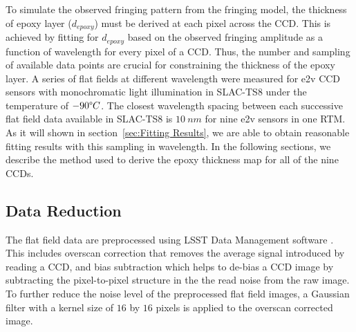 \documentclass[twocolumn]{aastex63} %
\begin{document}
\begin{CJK*}{UTF8}{gbsn}
To simulate the observed fringing pattern from the fringing model, the thickness of epoxy layer ($d_{epoxy}$) must be derived at each pixel across the CCD. This is achieved by fitting for $d_{epoxy}$ based on the observed fringing amplitude as a function of wavelength for every pixel of a CCD. Thus, the number and sampling of available data points are crucial for constraining the thickness of the epoxy layer. A series of flat fields at different wavelength were measured for e2v CCD sensors with monochromatic light illumination in SLAC-TS8 under the temperature of $-90 \degree C$. The closest wavelength spacing between each successive flat field data available in SLAC-TS8 is $10\ nm$ for nine e2v sensors in one RTM. As it will shown in section~\ref{sec:Fitting Results}, we are able to obtain reasonable fitting results with this sampling in wavelength.
In the following sections, we describe the method used to derive the epoxy thickness map for all of the nine CCDs.

\subsection{Data Reduction} \label{subsec: data reduction}
The flat field data are preprocessed using LSST Data Management software \citep{Juri17,Axelrod10}. This includes overscan correction that removes the average signal introduced by reading a CCD, and bias subtraction which helps to de-bias a CCD image by subtracting the pixel-to-pixel structure in the the read noise from the raw image. To further reduce the noise level of the preprocessed flat field images, a Gaussian filter with a kernel size of $16$ by $16$ pixels is applied to the overscan corrected image. 


\end{CJK*}
\end{document}
